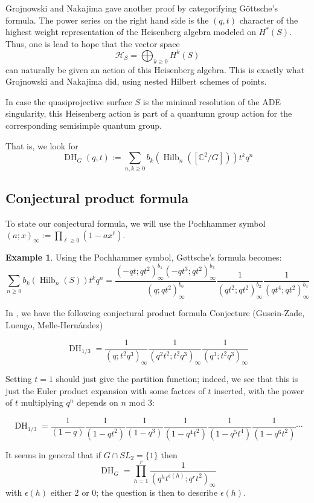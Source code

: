 \documentclass{amsart}[12pt]
\theoremstyle{definition}
\newtheorem{example}[dummy]{Example}
\newcommand{\C}{\mathbb{C}}
\DeclareMathOperator{\Hilb}{Hilb}
\DeclareMathOperator{\DC}{DH}
\begin{document}
Grojnowski and Nakajima gave another proof by categorifying G\"ottsche's formula.  The power series on the right hand side is the $(q,t)$ character of the highest weight representation of the Heisenberg algebra modeled on $H^*(S)$.  Thus, one is lead to hope that the vector space 
$$\mathcal{H}_S=\bigoplus_{k\geq 0} H^k(S)$$
can naturally be given an action of this Heisenberg algebra.  This is exactly what Grojnowski and Nakajima did, using nested Hilbert schemes of points.

In case the quasiprojective surface $S$ is the minimal resolution of the ADE singularity, this Heisenberg action is part of a quantumn group action for the corresponding semisimple quantum group.




That is, we look for 
$$\DC_G(q,t):=\sum_{n,k\geq 0 } b_k(\Hilb_n([\C^2/G])) t^kq^n$$





\subsection{Conjectural product formula}

To state our conjectural formula, we will use the Pochhammer symbol $(a;x)_\infty:=\prod_{\ell\geq 0} (1-ax^\ell)$.
\begin{example}
Using the Pochhammer symbol, G\o ttsche's formula becomes:
$$\sum_{n\geq 0} b_k(\Hilb_n(S))t^kq^n=
\frac{(-qt;qt^2)_\infty^{b_1}(-qt^3;qt^2)_\infty^{b_3}}{(q;qt^2)_\infty^{b_0}}\frac{1}{(qt^2;qt^2)_\infty^{b_2}}\frac{1}{(qt^4;qt^2)_\infty^{b_4}}$$
\end{example}

In \cite{GLMequivariant}, we have the following conjectural product formula 
{Conjecture (Gusein-Zade, Luengo, Melle-Hern\'andez)}

$$\DC_{1/3}=\frac{1}{(q;t^2q^3)_\infty}\frac{1}{(q^2t^2;t^2q^3)_\infty}\frac{1}{(q^3;t^2q^3)_\infty}$$

Setting $t=1$ should just give the partition function; indeed, we see that this is just the Euler product expansion with some factors of $t$ inserted, with the power of $t$ multiplying $q^n$ depends on $n$ mod 3:

$$\DC_{1/3}=\frac{1}{(1-q)}\frac{1}{(1-qt^2)}\frac{1}{(1-q^3)}\frac{1}{(1-q^4t^2)}
\frac{1}{(1-q^5t^4)}\frac{1}{(1-q^6t^2)}\cdots$$

 It seems in general that if $G\cap SL_2=\{1\}$ then
$$\DC_{G}=\prod_{h=1}^r \frac{1}{(q^h t^{\epsilon(h)}; q^r t^2)_\infty}$$
with $\epsilon(h)$ either 2 or 0; the question is then to describe $\epsilon(h)$.
\end{document}
